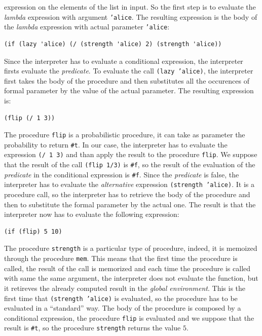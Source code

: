 \begin{itemize}
        expression on the elements of the list in input.
        So the first step is to evaluate the \textit{lambda} expression with argument \texttt{'alice}. The resulting expression is
        the body of the \textit{lambda} expression with actual parameter \texttt{'alice}:
        \begin{lstlisting}[caption={Application of \texttt{map} prcedure of Listing~\ref{lst:map}}, 
            captionpos=b, label={lst:lambda-body}]
(if (lazy 'alice) (/ (strength 'alice) 2) (strength 'alice))
        \end{lstlisting}
        Since the interpreter has to evaluate a conditional expression, the interpreter firsts evaluate the \textit{predicate}.
        To evaluate the call \texttt{(lazy 'alice)}, the interpreter first takes the body of the procedure and then substitutes
        all the occurences of formal parameter by the value of the actual parameter. The resulting expression is:
        \begin{lstlisting}[caption={Body of procedure \texttt{lazy} when evaluating Listing~\ref{lst:lambda-body}}, captionpos=b]
(flip (/ 1 3))
        \end{lstlisting}
        The procedure \texttt{flip} is a probabilistic procedure, it can take as parameter the probability to return \texttt{\#t}.
        In our case, the interpreter has to evaluate the expression \texttt{(/ 1 3)} and than apply the result to the procedure 
        \texttt{flip}.
        We suppose that the result of the call \texttt{(flip 1/3)} is \texttt{\#f}, so the result of the evaluation of the
        \textit{predicate} in the conditional expression is \texttt{\#f}. Since the \textit{predicate} is false, the interpreter has
        to evaluate the \textit{alternative} expression \texttt{(strength 'alice)}.
        It is a procedure call, so the interpreter has to retrieve the body of the procedure and then to substitute the formal
        parameter by the actual one.
        The result is that the interpreter now has to evaluate the following expression:
        \begin{lstlisting}[caption={Body of procedure \texttt{strength} when evaluating Listing~\ref{lst:lambda-body}}, captionpos=b]
(if (flip) 5 10)
        \end{lstlisting}
        The procedure \texttt{strength} is a particular type of procedure, indeed, it is memoized through the procedure \texttt{mem}.
        This means that the first time the procedure is called, the result of the call is memorized and each time the procedure is
        called with same the same argument, the interpreter does not evaluate the function, but it retireves the already computed
        result in the \textit{global environment}. This is the first time that \texttt{(strength 'alice)} is evaluated, 
        so the procedure has to be evaluated in a ``standard'' way.
        The body of the procedure is composed by a conditional expression, the procedure \texttt{flip} is evaluated and we suppose
        that the result is \texttt{\#t}, so the procedure \texttt{strength} returns the value $5$.


\end{itemize}
